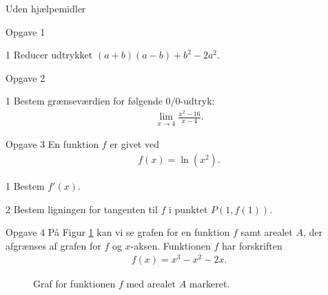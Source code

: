\begin{center}
	\LARGE
	Uden hjælpemidler
\end{center}
\begin{opgavetekst}{Opgave 1}
\end{opgavetekst}
\begin{delopgave}{1}
	Reducer udtrykket $(a + b)(a - b) + b^2 - 2a^2$.
\end{delopgave}
%
%
%
%
%
%
\begin{opgavetekst}{Opgave 2}
\end{opgavetekst}
\begin{delopgave}{1}
	Bestem grænseværdien for følgende $0/0$-udtryk:
	\begin{align*}
		\lim_{x \to 4} \frac{x^2 - 16}{x - 4}.
	\end{align*}
\end{delopgave}
%
%
%
%
%
\begin{opgavetekst}{Opgave 3}
	En funktion $f$ er givet ved 
	\begin{align*}
		f(x) = \ln(x^2).
	\end{align*}
\end{opgavetekst}
\begin{delopgave}{1}
	Bestem $f'(x)$.
\end{delopgave}
\begin{delopgave}{2}
	Bestem ligningen for tangenten til $f$ i punktet $P(1,f(1))$.
\end{delopgave}
%
%
%
%
%
\begin{opgavetekst}{Opgave 4}
	På Figur \ref{fig:arealer} kan vi se grafen for en funktion $f$ samt arealet $A$, der afgrænses af grafen for $f$ og $x$-aksen. Funktionen $f$ har forskriften
	\begin{align*}
		f(x) = x^3 - x^2 - 2x.
	\end{align*}
	\begin{figure}[H]
		\centering
		\caption{Graf for funktionen $f$ med arealet $A$ markeret.}
		\label{fig:arealer}
	\end{figure}
	\phantom{h}
\end{opgavetekst}
